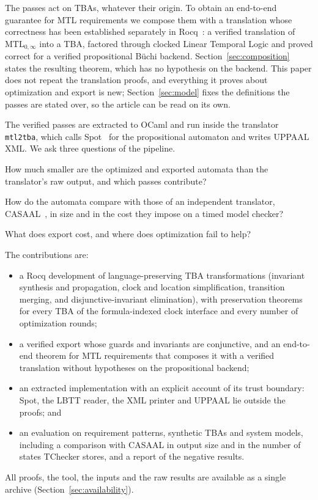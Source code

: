 The passes act on TBAs, whatever their origin. To obtain an end-to-end guarantee for MTL requirements we compose them with a translation whose correctness has been established separately in Rocq~\cite{faresmtl}: a verified translation of MTL$_{0,\infty}$ into a TBA, factored through clocked Linear Temporal Logic and proved correct for a verified propositional B\"uchi backend. Section~\ref{sec:composition} states the resulting theorem, which has no hypothesis on the backend. This paper does not repeat the translation proofs, and everything it proves about optimization and export is new; Section~\ref{sec:model} fixes the definitions the passes are stated over, so the article can be read on its own.

The verified passes are extracted to OCaml and run inside the translator \texttt{mtl2tba}, which calls Spot~\cite{spot} for the propositional automaton and writes UPPAAL XML. We ask three questions of the pipeline.
\begin{description}[leftmargin=0pt,labelindent=0pt]
  \item[RQ1] How much smaller are the optimized and exported automata than the translator's raw output, and which passes contribute?
  \item[RQ2] How do the automata compare with those of an independent translator, CASAAL~\cite{casaal}, in size and in the cost they impose on a timed model checker?
  \item[RQ3] What does export cost, and where does optimization fail to help?
\end{description}
The contributions are:
\begin{itemize}[leftmargin=*]
  \item a Rocq development of language-preserving TBA transformations (invariant synthesis and propagation, clock and location simplification, transition merging, and disjunctive-invariant elimination), with preservation theorems for every TBA of the formula-indexed clock interface and every number of optimization rounds;
  \item a verified export whose guards and invariants are conjunctive, and an end-to-end theorem for MTL requirements that composes it with a verified translation without hypotheses on the propositional backend;
  \item an extracted implementation with an explicit account of its trust boundary: Spot, the LBTT reader, the XML printer and UPPAAL lie outside the proofs; and
  \item an evaluation on requirement patterns, synthetic TBAs and system models, including a comparison with CASAAL in output size and in the number of states TChecker stores, and a report of the negative results.
\end{itemize}
All proofs, the tool, the inputs and the raw results are available as a single archive (Section~\ref{sec:availability}).
